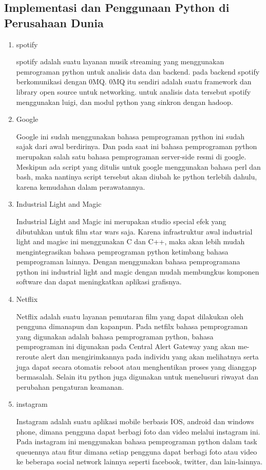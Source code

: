 \subsection{Implementasi dan Penggunaan Python di Perusahaan Dunia}
\begin{enumerate}
\item spotify 
\par
spotify adalah suatu layanan musik streaming yang menggunakan pemrograman python untuk analisis data dan backend. pada backend spotify berkomunikasi dengan 0MQ. 0MQ itu sendiri  adalah suatu framework dan library open source untuk networking. untuk analisis data tersebut spotify menggunakan luigi, dan modul python yang sinkron dengan hadoop.
\item Google
\par 
Google ini sudah menggunakan bahasa pemprograman python ini sudah sajak dari awal berdirinya. Dan pada saat ini bahasa pemprograman python merupakan salah satu bahasa pemprograman server-side resmi di google. Meskipun ada script yang ditulis untuk google menggunakan bahasa perl dan bash, maka nantinya script tersebut akan diubah ke python terlebih dahulu, karena kemudahan dalam perawatannya.
\item Industrial Light and Magic
\par 
Industrial Light and Magic ini merupakan studio special efek yang dibutuhkan untuk film star wars saja. Karena infrastruktur awal industrial light and magisc ini menggunakan C dan C++, maka akan lebih mudah mengintegrasikan bahasa pemprograman python ketimbang bahasa pemprograman lainnya. Dengan menggunakan bahasa pemprogramana python ini industrial light and magic dengan mudah membungkus komponen software dan dapat meningkatkan aplikasi grafisnya.
\item Netflix
\par 
Netflix adalah suatu layanan pemutaran film yang dapat dilakukan oleh pengguna dimanapun dan kapanpun. Pada netfilx bahasa pemprograman yang digunakan adalah bahasa pemprograman python, bahasa pemprograman ini digunakan pada Central Alert Gateway yang akan me-reroute alert dan mengirimkannya pada individu yang akan melihatnya serta juga  dapat secara otomatis reboot atau menghentikan proses yang dianggap bermasalah. Selain itu python juga digunakan untuk menelusuri riwayat dan perubahan pengaturan keamanan.
\item instagram 
\par 
Instagram adalah suatu aplikasi mobile berbasis IOS, android dan windows phone, dimana pengguna dapat berbagi foto dan video melalui instagram ini. Pada instagram ini menggunakan bahasa pemprograman python dalam task queuennya atau fitur dimana setiap pengguna dapat berbagi foto atau video ke beberapa social network lainnya seperti facebook, twitter, dan lain-lainnya.

\end{enumerate}

